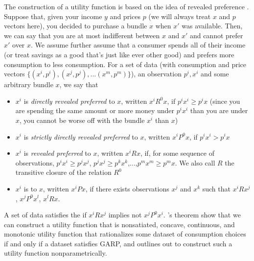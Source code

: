 \begin{description}
The construction of a utility function is based on the idea of revealed preference \citep{varianNonparametric}. Suppose that, given your income $y$ and prices $p$ (we will always treat $x$ and $p$ vectors here), you decided to purchase a bundle $x$ when $x'$ was available. Then, we can say that you are at most indifferent between $x$ and $x'$ and cannot prefer $x'$ over $x$. We assume further assume that a consumer spends all of their income (or treat savings as a good that's just like ever other good) and prefers more consumption to less consumption. For a set of data (with consumption and price vectors $\{(x^i,p^i),(x^j, p^j),...(x^m,p^m)\}$), an observation $p^i, x^i$ and some arbitrary bundle $x$, we say that
\begin{itemize}
    \item $x^i$ is \textit{directly revealed preferred} to $x$, written $x^iR^0x$, if $p^ix^i \geq p^ix$ (since you are spending the same amount or more money under $p^ix^i$ than you are under $x$, you cannot be worse off with the bundle $x^i$ than $x$)
    \item $x^i$ is \textit{strictly directly revealed preferred} to $x$, written $x^iP^0x$, if $p^ix^i > p^ix$
    \item $x^i$ is \textit{revealed preferred} to $x$, written $x^iRx$, if, for some sequence of observations, $p^ix^i \geq p^jx^j$, $p^jx^j \geq p^kx^k$,$...$,$p^mx^m \geq p^mx$. We also call $R$ the transitive closure of the relation $R^0$
    \item $x^i$ is  to $x$, written $x^iPx$, if there exists observations $x^j$ and $x^k$ such that $x^i R x^j$, $x^jP^0x^l$, $x^lRx$.
\end{itemize}

A set of data satisfies the  if $x^iRx^j$ implies not $x^jP^0x^i$. \citet{afriat}'s theorem show that we can construct a utility function that is nonsatiated, concave, continuous, and monotonic utility function that rationalizes some dataset of consumption choices if and only if a dataset satisfies GARP, and \citet{varianNonparametric} outlines out to construct such a utility function nonparametrically.


\end{description}
